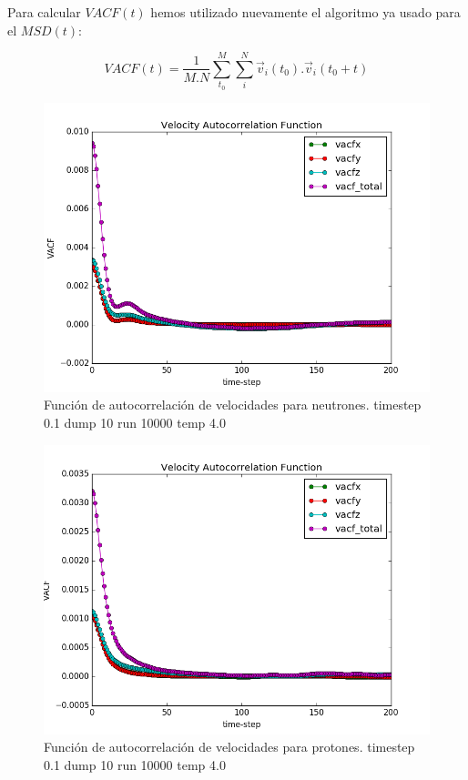 \documentclass[
 reprint,
 amsmath,amssymb,
 aps,
 a4paper
]{revtex4-1}
\begin{document}
Para calcular $VACF(t)$ hemos utilizado nuevamente el algoritmo ya usado para el $MSD(t)$:

\begin{equation}\label{eq:MSD}
VACF(t)=\frac{1}{M.N}\sum_{t_0}^{M}\sum_{i}^{N}\vec{v}_i(t_0).\vec{v}_i(t_0+t)
\end{equation}

\begin{figure}[H]
\centerline{
  \includegraphics[width=1.0\linewidth]{vacf_N_200.png}}
  \caption{\small Función de autocorrelación de velocidades para neutrones. timestep 0.1 dump 10 run 10000 temp 4.0}
  \label{fig:vacf_N_200}
\end{figure}

\begin{figure}[H]
\centerline{
  \includegraphics[width=1.0\linewidth]{vacf_Z_200.png}}
  \caption{\small Función de autocorrelación de velocidades para protones. timestep 0.1 dump 10 run 10000 temp 4.0}
  \label{fig:vacf_Z_200}
\end{figure}
\end{document}
